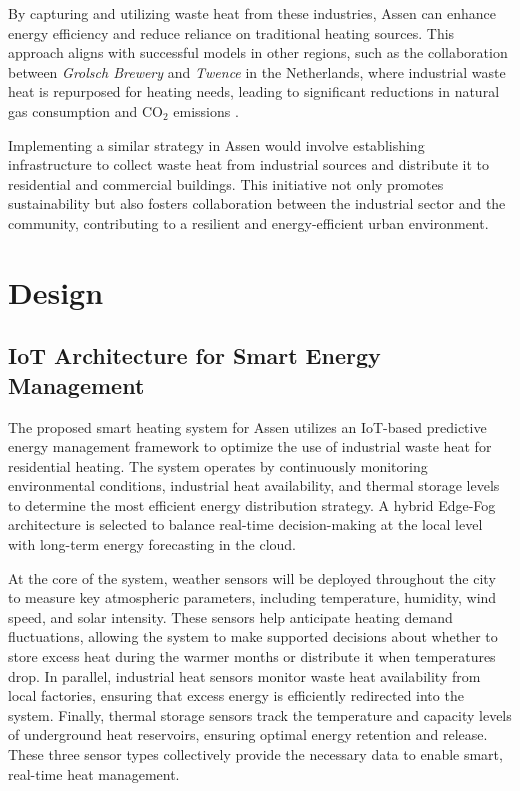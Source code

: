 \documentclass{article}
\begin{document}
By capturing and utilizing waste heat from these industries, Assen can enhance energy efficiency and reduce reliance on traditional heating sources. This approach aligns with successful models in other regions, such as the collaboration between \textit{Grolsch Brewery} and \textit{Twence} in the Netherlands, where industrial waste heat is repurposed for heating needs, leading to significant reductions in natural gas consumption and CO$_2$ emissions \cite{grolsch_twence}.

Implementing a similar strategy in Assen would involve establishing infrastructure to collect waste heat from industrial sources and distribute it to residential and commercial buildings. This initiative not only promotes sustainability but also fosters collaboration between the industrial sector and the community, contributing to a resilient and energy-efficient urban environment.


\section{Design}

\subsection{IoT Architecture for Smart Energy Management}

The proposed smart heating system for Assen utilizes an IoT-based predictive energy management framework to optimize the use of industrial waste heat for residential heating. The system operates by continuously monitoring environmental conditions, industrial heat availability, and thermal storage levels to determine the most efficient energy distribution strategy. A hybrid Edge-Fog architecture is selected to balance real-time decision-making at the local level with long-term energy forecasting in the cloud.

At the core of the system, weather sensors will be deployed throughout the city to measure key atmospheric parameters, including temperature, humidity, wind speed, and solar intensity. These sensors help anticipate heating demand fluctuations, allowing the system to make supported decisions about whether to store excess heat during the warmer months or distribute it when temperatures drop. In parallel, industrial heat sensors monitor waste heat availability from local factories, ensuring that excess energy is efficiently redirected into the system. Finally, thermal storage sensors track the temperature and capacity levels of underground heat reservoirs, ensuring optimal energy retention and release. These three sensor types collectively provide the necessary data to enable smart, real-time heat management.
\end{document}

